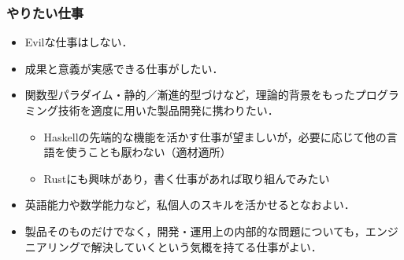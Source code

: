 \documentclass[a4j,draft]{ltjsarticle}
\begin{document}
\subsubsection*{やりたい仕事}
\begin{itemize}
  \item Evilな仕事はしない．
  \item 成果と意義が実感できる仕事がしたい．
  \item 関数型パラダイム・静的／漸進的型づけなど，理論的背景をもったプログラミング技術を適度に用いた製品開発に携わりたい．
  \begin{itemize}
    \item Haskellの先端的な機能を活かす仕事が望ましいが，必要に応じて他の言語を使うことも厭わない（適材適所）
    \item Rustにも興味があり，書く仕事があれば取り組んでみたい
  \end{itemize}
  \item 英語能力や数学能力など，私個人のスキルを活かせるとなおよい．
  \item 製品そのものだけでなく，開発・運用上の内部的な問題についても，エンジニアリングで解決していくという気概を持てる仕事がよい．
\end{itemize}

\end{document}
